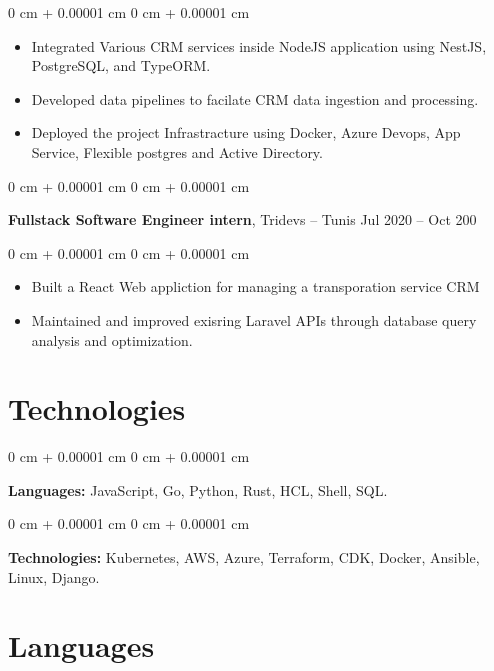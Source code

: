 \documentclass[10pt, letterpaper]{article}
\newenvironment{highlights}{ \begin{itemize}[ topsep=0.10 cm, parsep=0.10 cm, partopsep=0pt,
itemsep=0pt, leftmargin=0 cm + 10pt ] }{ \end{itemize} } %
\newenvironment{onecolentry}{ \begin{adjustwidth}{ 0 cm + 0.00001 cm }{ 0 cm + 0.00001 cm }
}{ \end{adjustwidth} } %
\newenvironment{twocolentry}[2][]{ \onecolentry \def\secondColumn{#2} \setcolumnwidth{\fill, 4.5 cm}
\begin{paracol}{2} }{ \switchcolumn \raggedleft \secondColumn \end{paracol}
\endonecolentry } %
\begin{document}
\vspace{0.10 cm}
\begin{onecolentry}
	\begin{highlights}
		\item Integrated Various CRM services inside NodeJS application using NestJS, PostgreSQL, and TypeORM.
		\item Developed data pipelines to facilate CRM data ingestion and processing.
		\item Deployed the project Infrastracture using Docker, Azure Devops, App Service, Flexible postgres and  Active Directory.
	\end{highlights}
\end{onecolentry}

\vspace{0.3 cm}
\begin{twocolentry}
	{ Jul 2020 – Oct 200 } \textbf{Fullstack Software Engineer intern}, Tridevs --
	Tunis
\end{twocolentry}

\vspace{0.10 cm}
\begin{onecolentry}
	\begin{highlights}
		\item Built a React Web appliction for managing a transporation service CRM
		\item Maintained and improved exisring Laravel APIs through database query analysis and optimization.
	\end{highlights}
\end{onecolentry}

\section{Technologies}
\begin{onecolentry}
	\textbf{Languages:} JavaScript, Go, Python, Rust, HCL, Shell, SQL.
\end{onecolentry}

\vspace{0.2 cm}

\begin{onecolentry}
	\textbf{Technologies:} Kubernetes, AWS, Azure, Terraform, CDK, Docker, Ansible, Linux, Django.
\end{onecolentry}

\section{Languages}
\end{document}
